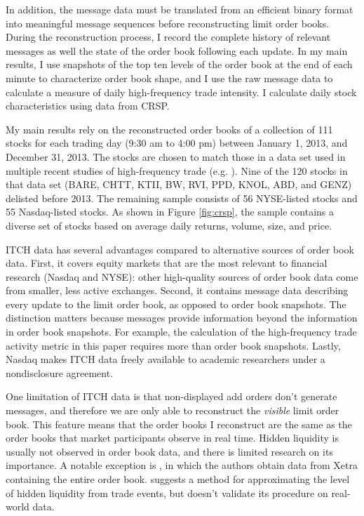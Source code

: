 In addition, the message data must be translated from an efficient binary format into meaningful message sequences before reconstructing limit order books. During the reconstruction process, I record the complete history of relevant messages as well the state of the order book following each update. In my main results, I use snapshots of the top ten levels of the order book at the end of each minute to characterize order book shape, and I use the raw message data to calculate a measure of daily high-frequency trade intensity. I calculate daily stock characteristics using data from CRSP.

My main results rely on the reconstructed order books of a collection of 111 stocks for each trading day (9:30 am to 4:00 pm) between January 1, 2013, and December 31, 2013. The stocks are chosen to match those in a data set used in multiple recent studies of high-frequency trade (e.g. \citet{Brogaard2014}). Nine of the 120 stocks in that data set (BARE, CHTT, KTII, BW, RVI, PPD, KNOL, ABD, and GENZ) delisted before 2013. The remaining sample consists of 56 NYSE-listed stocks and 55 Nasdaq-listed stocks. As shown in Figure \ref{fig:crsp}, the sample contains a diverse set of stocks based on average daily returns, volume, size, and price.




ITCH data has several advantages compared to alternative sources of order book data. First, it covers equity markets that are the most relevant to financial research (Nasdaq and NYSE): other high-quality sources of order book data come from smaller, less active exchanges. Second, it contains message data describing every update to the limit order book, as opposed to order book snapshots. The distinction matters because messages provide information beyond the information in order book snapshots. For example, the calculation of the high-frequency trade activity metric in this paper requires more than order book snapshots. Lastly, Nasdaq makes ITCH data freely available to academic researchers under a nondisclosure agreement.

One limitation of ITCH data is that non-displayed add orders don't generate messages, and therefore we are only able to reconstruct the \textit{visible} limit order book. This feature means that the order books I reconstruct are the same as the order books that market participants observe in real time. Hidden liquidity is usually not observed in order book data, and there is limited research on its importance. A notable exception is \citet{Beltran-Lopez2009}, in which the authors obtain data from Xetra containing the entire order book. \citet{Avellaneda2011} suggests a method for approximating the level of hidden liquidity from trade events, but doesn't validate its procedure on real-world data.

